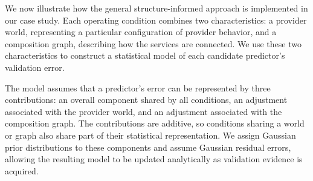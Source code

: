 \documentclass[10pt,a4paper]{article}
\begin{document}
We now illustrate how the general structure-informed approach is implemented in our case study. Each operating condition combines two characteristics: a provider world, representing a particular configuration of provider behavior, and a composition graph, describing how the services are connected. We use these two characteristics to construct a statistical model of each candidate predictor's validation error.

The model assumes that a predictor's error can be represented by three contributions: an overall component shared by all conditions, an adjustment associated with the provider world, and an adjustment associated with the composition graph. The contributions are additive, so conditions sharing a world or graph also share part of their statistical representation. We assign Gaussian prior distributions to these components and assume Gaussian residual errors, allowing the resulting model to be updated analytically as validation evidence is acquired.
\end{document}
